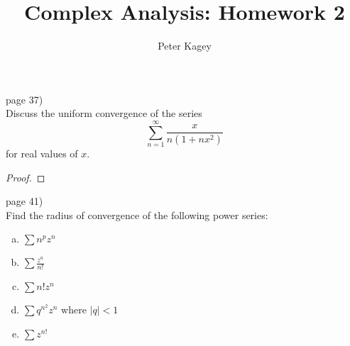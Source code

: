\documentclass{article}
\newenvironment{problem}[2][Problem]{\begin{trivlist}
\item[\hskip \labelsep {\bfseries #1}\hskip \labelsep {\bfseries #2.}]}{\end{trivlist}}
\begin{document}
\title{Complex Analysis: Homework 2}
\author{Peter Kagey}

\maketitle

\begin{problem}{5} (page 37) \\
  Discuss the uniform convergence of the series \[
    \sum_{n = 1}^{\infty} \frac{x}{n(1 + nx^2)}
  \] for real values of $x$.
\end{problem}

\begin{proof}
\end{proof}

\pagebreak

\begin{problem}{3} (page 41) \\
  Find the radius of convergence of the following power series: \begin{enumerate}[(a)]
    \item $\displaystyle\sum n^p z^n$
    \item $\displaystyle\sum \frac{z^n}{n!}$
    \item $\displaystyle\sum n!z^n$
    \item $\displaystyle\sum q^{n^2}z^n$ where $|q| < 1$
    \item $\displaystyle\sum z^{n!}$
  \end{enumerate}
\end{problem}
\end{document}
